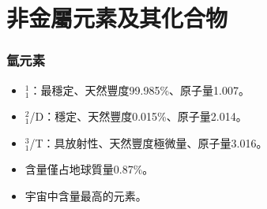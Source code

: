 \documentclass[a4paper,12pt]{report}
\begin{document}
\section{非金屬元素及其化合物}
\subsubsection{氫元素}
\begin{itemize}
\item {}$^1_1$\rmH：最穩定、天然豐度99.985\%、原子量1.007。
\item {}$^2_1$\rmH/D：穩定、天然豐度0.015\%、原子量2.014。
\item {}$^3_1$\rmH/T：具放射性、天然豐度極微量、原子量3.016。
\item 含量僅占地球質量0.87\%。
\item 宇宙中含量最高的元素。
\end{itemize}
\end{document}
